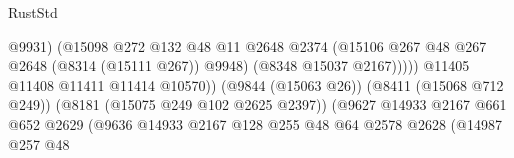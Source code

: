 \begin{lexlean}{RustStd}
\begin{coremodule}
                                                            @9931)
                                                          (@15098
                                                            @272
                                                            @132
                                                            @48
                                                            @11
                                                            @2648
                                                            @2374
                                                            (@15106
                                                              @267
                                                              @48
                                                              @267
                                                              @2648
                                                              (@8314 (@15111 @267))
                                                              @9948)
                                                            (@8348 @15037 @2167)))))
                                                    @11405
                                                    @11408
                                                    @11411
                                                    @11414
                                                    @10570))
                                                (@9844 (@15063 @26))
                                                (@8411 (@15068 @712 @249))
                                                (@8181 (@15075 @249 @102 @2625 @2397))
                                                (@9627
                                                  @14933
                                                  @2167
                                                  @661
                                                  @652
                                                  @2629
                                                  (@9636
                                                    @14933
                                                    @2167
                                                    @128
                                                    @255
                                                    @48
                                                    @64
                                                    @2578
                                                    @2628
                                                    (@14987
                                                      @257
                                                      @48

\end{coremodule}
\end{lexlean}
